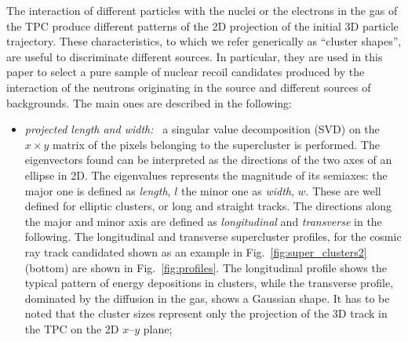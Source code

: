 The interaction of different particles with the nuclei or the
electrons in the gas of the TPC produce different patterns of the 2D
projection of the initial 3D particle trajectory.  These
characteristics, to which we refer generically as ``cluster shapes'',
are useful to discriminate different sources. In particular, they are
used in this paper to select a pure sample of nuclear recoil
candidates produced by the interaction of the neutrons originating in
the \ambe source and different sources of backgrounds. The main ones
are described in the following:

\begin{itemize}
  \item \textit{projected length and width:~} a singular value
    decomposition (SVD) on the $x \times y$ matrix of the pixels
    belonging to the supercluster is performed. The eigenvectors found
    can be interpreted as the directions of the two axes of an ellipse
    in 2D. The eigenvalues represents the magnitude of its semiaxes:
    the major one is defined as \textit{length}, $l$ the minor one
    as \textit{width}, $w$. These are well defined for elliptic
    clusters, or long and straight tracks. The directions along the
    major and minor axis are defined as \textit{longitudinal}
    and \textit{transverse} in the following. The longitudinal and
    transverse supercluster profiles, for the cosmic ray track
    candidated shown as an example in Fig.~\ref{fig:super_clusters2}
    (bottom) are shown in Fig.~\ref{fig:profiles}. The longitudinal
    profile shows the typical pattern of energy depositions in
    clusters, while the transverse profile, dominated by the diffusion
    in the gas, shows a Gaussian shape. It has to be noted that the
    cluster sizes represent only the projection of the 3D track in the
    TPC on the 2D $x$--$y$ plane;


\end{itemize}
